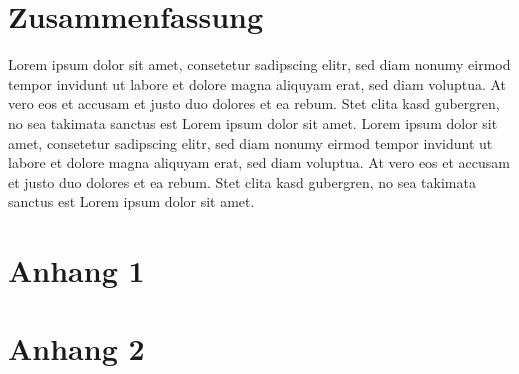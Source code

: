 	\section{Zusammenfassung} 
	
		Lorem ipsum dolor sit amet, consetetur sadipscing elitr, sed diam nonumy eirmod tempor invidunt ut labore et dolore magna aliquyam erat, sed diam voluptua. At vero eos et accusam et justo duo dolores et ea rebum. Stet clita kasd gubergren, no sea takimata sanctus est Lorem ipsum dolor sit amet. Lorem ipsum dolor sit amet, consetetur sadipscing elitr, sed diam nonumy eirmod tempor invidunt ut labore et dolore magna aliquyam erat, sed diam voluptua. At vero eos et accusam et justo duo dolores et ea rebum. Stet clita kasd gubergren, no sea takimata sanctus est Lorem ipsum dolor sit amet.
	\printbibliography[heading=bibintoc,title=Literaturverzeichnis] %
	
	\appendix %
	\section{Anhang 1}
	
	\section{Anhang 2}
	
